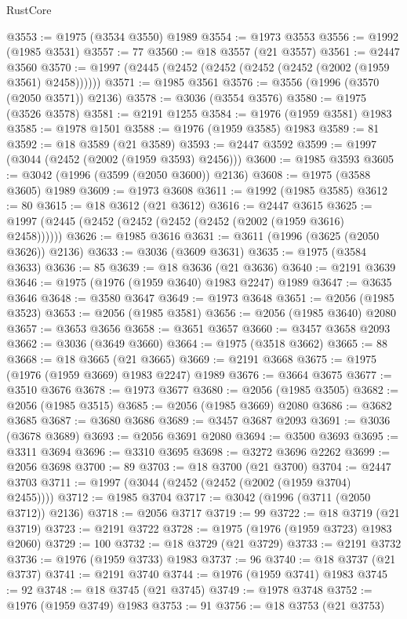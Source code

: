 \begin{lexlean}{RustCore}
\begin{coremodule}
@3553 := @1975 (@3534 @3550) @1989
@3554 := @1973 @3553
@3556 := @1992 (@1985 @3531)
@3557 := 77
@3560 := @18 @3557 (@21 @3557)
@3561 := @2447 @3560
@3570 := @1997 (@2445 (@2452 (@2452 (@2452 (@2452 (@2002 (@1959 @3561) @2458))))))
@3571 := @1985 @3561
@3576 := @3556 (@1996 (@3570 (@2050 @3571)) @2136)
@3578 := @3036 (@3554 @3576)
@3580 := @1975 (@3526 @3578)
@3581 := @2191 @1255
@3584 := @1976 (@1959 @3581) @1983
@3585 := @1978 @1501
@3588 := @1976 (@1959 @3585) @1983
@3589 := 81
@3592 := @18 @3589 (@21 @3589)
@3593 := @2447 @3592
@3599 := @1997 (@3044 (@2452 (@2002 (@1959 @3593) @2456)))
@3600 := @1985 @3593
@3605 := @3042 (@1996 (@3599 (@2050 @3600)) @2136)
@3608 := @1975 (@3588 @3605) @1989
@3609 := @1973 @3608
@3611 := @1992 (@1985 @3585)
@3612 := 80
@3615 := @18 @3612 (@21 @3612)
@3616 := @2447 @3615
@3625 := @1997 (@2445 (@2452 (@2452 (@2452 (@2452 (@2002 (@1959 @3616) @2458))))))
@3626 := @1985 @3616
@3631 := @3611 (@1996 (@3625 (@2050 @3626)) @2136)
@3633 := @3036 (@3609 @3631)
@3635 := @1975 (@3584 @3633)
@3636 := 85
@3639 := @18 @3636 (@21 @3636)
@3640 := @2191 @3639
@3646 := @1975 (@1976 (@1959 @3640) @1983 @2247) @1989
@3647 := @3635 @3646
@3648 := @3580 @3647
@3649 := @1973 @3648
@3651 := @2056 (@1985 @3523)
@3653 := @2056 (@1985 @3581)
@3656 := @2056 (@1985 @3640) @2080
@3657 := @3653 @3656
@3658 := @3651 @3657
@3660 := @3457 @3658 @2093
@3662 := @3036 (@3649 @3660)
@3664 := @1975 (@3518 @3662)
@3665 := 88
@3668 := @18 @3665 (@21 @3665)
@3669 := @2191 @3668
@3675 := @1975 (@1976 (@1959 @3669) @1983 @2247) @1989
@3676 := @3664 @3675
@3677 := @3510 @3676
@3678 := @1973 @3677
@3680 := @2056 (@1985 @3505)
@3682 := @2056 (@1985 @3515)
@3685 := @2056 (@1985 @3669) @2080
@3686 := @3682 @3685
@3687 := @3680 @3686
@3689 := @3457 @3687 @2093
@3691 := @3036 (@3678 @3689)
@3693 := @2056 @3691 @2080
@3694 := @3500 @3693
@3695 := @3311 @3694
@3696 := @3310 @3695
@3698 := @3272 @3696 @2262
@3699 := @2056 @3698
@3700 := 89
@3703 := @18 @3700 (@21 @3700)
@3704 := @2447 @3703
@3711 := @1997 (@3044 (@2452 (@2452 (@2002 (@1959 @3704) @2455))))
@3712 := @1985 @3704
@3717 := @3042 (@1996 (@3711 (@2050 @3712)) @2136)
@3718 := @2056 @3717
@3719 := 99
@3722 := @18 @3719 (@21 @3719)
@3723 := @2191 @3722
@3728 := @1975 (@1976 (@1959 @3723) @1983 @2060)
@3729 := 100
@3732 := @18 @3729 (@21 @3729)
@3733 := @2191 @3732
@3736 := @1976 (@1959 @3733) @1983
@3737 := 96
@3740 := @18 @3737 (@21 @3737)
@3741 := @2191 @3740
@3744 := @1976 (@1959 @3741) @1983
@3745 := 92
@3748 := @18 @3745 (@21 @3745)
@3749 := @1978 @3748
@3752 := @1976 (@1959 @3749) @1983
@3753 := 91
@3756 := @18 @3753 (@21 @3753)

\end{coremodule}
\end{lexlean}
